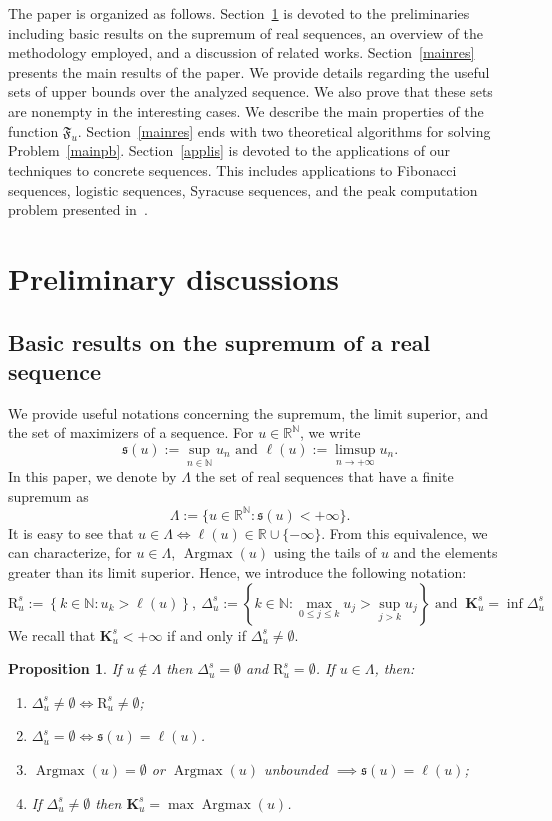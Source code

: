 \documentclass{article}
\def\valu#1{\mathfrak{s}(#1)}
\def\ls#1{\boldsymbol{\ell}(#1)}
\def\Fu{\mathfrak{F}_u}
\def\rr{\mathbb R}
\def\nn{\mathbb N}
\def\agmx{\operatorname{Argmax}}
\def\gs{\Delta^s}
\def\bigks{\mathbf{K}^s}
\def\gls#1{{\mathrm R}_{#1}}
\def\gsls#1{\gls{#1}^s}
\newtheorem{prop}{Proposition}
\def\blue#1{#1}
\begin{document}
	
	The paper is organized as follows. Section~\ref{sec:preliminary} is devoted to \blue{the preliminaries including basic results} on the supremum of real sequences\blue{, an overview of the methodology employed, and a discussion of related works}. Section~\ref{mainres} \blue{presents} the main results of the paper. We provide details regarding the useful sets of upper bounds over the analyzed sequence. We also prove that these sets are nonempty in the interesting cases. We \blue{describe} the main properties of the function $\Fu$. Section~\ref{mainres} \blue{ends with} \blue{two} theoretical algorithms \blue{for solving} Problem~\ref{mainpb}. Section~\ref{applis} \blue{is devoted to the} applications of our techniques to concrete sequences. This includes applications to Fibonacci sequences, logistic sequences, Syracuse sequences, and the peak computation problem presented in~\cite{ahiyevich2018upper}.  
	\blue{
	\section{Preliminary discussions}
	\label{sec:preliminary}
	\subsection{Basic results on the supremum of a real sequence}
	We provide useful notations concerning the supremum, the limit superior, and the set of maximizers of a sequence.
		For $u\in\rr^\nn$, we write 
\[		
		\valu{u}:=\sup_{n\in\nn} u_n \text{ and } \ls{u}:=\limsup_{n\to +\infty} u_n.
	\]
	In this paper, we denote by $\Lambda$ the set of real sequences that have a finite supremum as
\[
\Lambda:=\{u\in \rr^\nn : \valu{u}<+\infty\}.
\]
It is easy to see that $u\in \Lambda\iff \ls{u}\in\rr\cup\{-\infty\}$. From this equivalence, we can characterize, for $u\in\Lambda$, $\agmx(u)$ using the tails of $u$ and the elements greater than its limit superior. Hence, we introduce the following notation:
	\[
	 \gsls{u}:=\left\{k\in\nn: u_k>\ls{u}\right\},\ \gs_u:=\left\{k\in\nn: \max_{0\leq j\leq k} u_j>\sup_{j>k} u_j\right\} \text{ and }\ \bigks_u=\inf\gs_u
	\]
	We recall that $\bigks_u<+\infty$ if and only if $\gs_u\neq\emptyset$. 
		\begin{prop}
		\label{argmax}
		If $u\notin \Lambda$ then $\gs_u=\emptyset$ and $\gsls{u}=\emptyset$. If $u\in\Lambda$, then:
		\begin{enumerate}
		\item $\gs_u\neq\emptyset\iff \gsls{u}\neq \emptyset$;
			\item $\gs_u=\emptyset\iff \valu{u}=\ls{u}$.
			\item $\agmx(u)=\emptyset$ or $\agmx(u)$ unbounded $\implies \valu{u}=\ls{u}$;
			\item If $\gs_u\neq\emptyset$ then $\bigks_u=\max\agmx(u)$. 
		\end{enumerate}
	\end{prop}
	}
\end{document}
